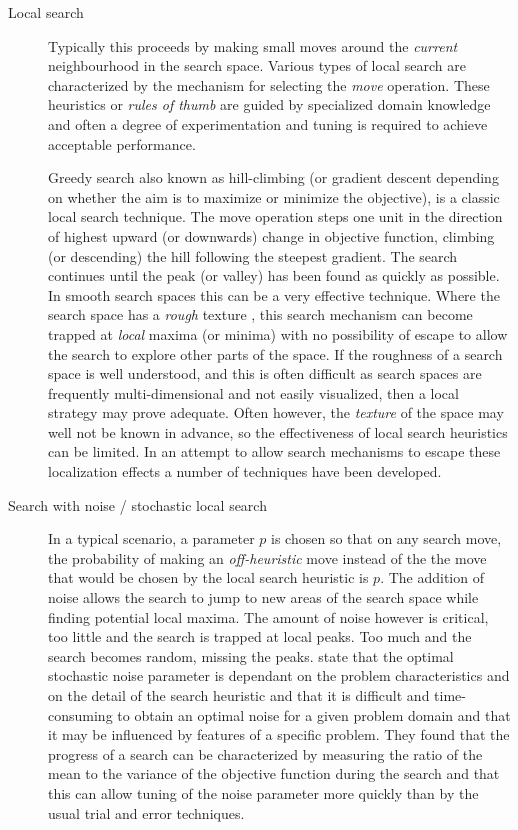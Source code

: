 \begin{description}
\item[Local search]
Typically this proceeds by making small moves around the \emph{current} neighbourhood in the search space. Various types of local search are characterized by the mechanism for selecting the \emph{move} operation. These heuristics or \emph{rules of thumb} are guided by specialized domain knowledge and often a degree of experimentation and tuning is required to achieve acceptable performance.

Greedy search also known as hill-climbing (or gradient descent depending on whether the aim is to maximize or minimize the objective), is a classic local search technique. The move operation steps one unit in the direction of highest upward (or downwards) change in objective function, climbing (or descending) the hill following the steepest gradient. The search continues until the peak (or valley) has been found as quickly as possible. In smooth search spaces this can be a very effective technique. Where the search space has a \emph{rough} texture \citep{beck97texturebased, fox89constrained}, this search mechanism can become trapped at \emph{local} maxima (or minima) with no possibility of escape to allow the search to explore other parts of the space. If the roughness of a search space is well understood, and this is often difficult as search spaces are frequently multi-dimensional and not easily visualized, then a local strategy may prove adequate. Often however, the \emph{texture} of the space may well not be known in advance, so the effectiveness of local search heuristics can be limited. In an attempt to allow search mechanisms to escape these localization effects a number of techniques have been developed.

\item[Search with noise / stochastic local search]
In a typical scenario, a parameter $p$ is chosen so that on any search move, the probability of making an \emph{off-heuristic} move instead of the the move that would be chosen by the local search heuristic is $p$. The addition of noise allows the search to jump to new areas of the search space while finding potential local maxima. The amount of noise however is critical, too little and the search is trapped at local peaks. Too much and the search becomes random, missing the peaks. \citet{mcallester97evidence} state that the optimal stochastic noise parameter is dependant on the problem characteristics and on the detail of the search heuristic and that it is difficult and time-consuming to obtain an optimal noise for a given problem domain and that it may be influenced by features of a specific problem. They found that the progress of a search can be characterized by measuring the ratio of the mean to the variance of the objective function during the search and that this can allow tuning of the noise parameter more quickly than by the usual trial and error techniques.


\end{description}
